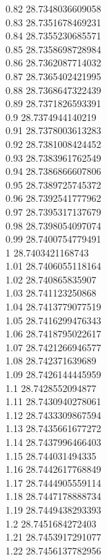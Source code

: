 {0.82	28.7348036609058\\
0.83	28.7351678469231\\
0.84	28.7355230685571\\
0.85	28.7358698728984\\
0.86	28.7362087714032\\
0.87	28.7365402421995\\
0.88	28.7368647322439\\
0.89	28.7371826593391\\
0.9	28.7374944140219\\
0.91	28.7378003613283\\
0.92	28.7381008424452\\
0.93	28.7383961762549\\
0.94	28.7386866607806\\
0.95	28.7389725745372\\
0.96	28.7392541777962\\
0.97	28.7395317137679\\
0.98	28.7398054097074\\
0.99	28.7400754779491\\
1	28.7403421168743\\
1.01	28.7406055118164\\
1.02	28.740865835907\\
1.03	28.741123250868\\
1.04	28.7413779077519\\
1.05	28.7416299476343\\
1.06	28.7418795022617\\
1.07	28.7421266946577\\
1.08	28.742371639689\\
1.09	28.7426144445959\\
1.1	28.7428552094877\\
1.11	28.7430940278061\\
1.12	28.7433309867594\\
1.13	28.7435661677272\\
1.14	28.7437996466403\\
1.15	28.744031494335\\
1.16	28.7442617768849\\
1.17	28.7444905559114\\
1.18	28.7447178888734\\
1.19	28.7449438293393\\
1.2	28.7451684272403\\
1.21	28.7453917291077\\
1.22	28.7456137782956\\
}
